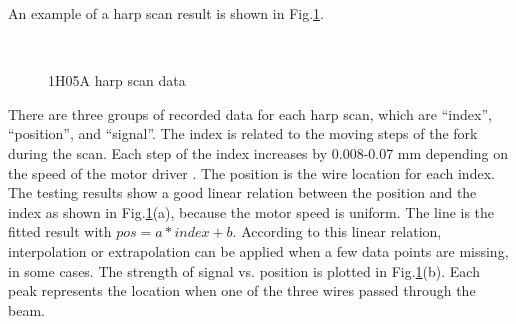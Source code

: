 \documentclass[english,review,number,sort&compress]{elsarticle}
\begin{document}
An example of a harp scan result is shown in Fig.\ref{fig:1H05A-harp-scan}.
\begin{figure}[tbph]
\begin{centering}
$\qquad$
\par\end{centering}

\protect\caption{\label{fig:1H05A-harp-scan}1H05A harp scan data}
\end{figure}
 There are three groups of recorded data for each harp scan, which are ``index'', ``position'', and ``signal''. The index is related to the moving steps of the fork during the scan. Each step of the index increases by 0.008-0.07 mm depending on the speed of the motor driver \citep{yan261}. The position is the wire location for each index. The testing results show a good linear relation between the position and the index as shown in Fig.\ref{fig:1H05A-harp-scan}(a), because the motor speed is uniform. The line is the fitted result with $pos=a*index+b$. According to this linear relation, interpolation or extrapolation can be applied when a few data points are missing, in some cases. The strength of signal vs. position is plotted in Fig.\ref{fig:1H05A-harp-scan}(b). Each peak represents the location when one of the three wires passed through the beam.
\end{document}
